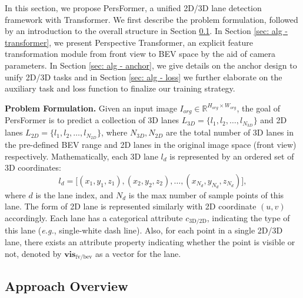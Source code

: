 \documentclass[runningheads]{llncs}
\begin{document}
In this section, we propose PersFormer, a unified 2D/3D lane detection framework with Transformer. 
We first describe the problem formulation, followed by an introduction to the overall structure in Section \ref{sec: alg - pipeline}. 
In Section \ref{sec: alg - transformer}, we present Perspective Transformer, an explicit feature transformation module
{from front view to BEV space by the aid of camera parameters}.
In Section \ref{sec: alg - anchor}, we give details on the anchor design to unify 2D/3D tasks
and in Section \ref{sec: alg - loss} we further elaborate on the auxiliary task and loss function to finalize our training strategy.


\textbf{Problem Formulation.}
Given an input image $I_{org} \in \mathbb{R}^{H_{org} \times W_{org}}$, the goal of PersFormer is to predict a collection of 3D lanes $L_{3D} = \{ l_1, l_2, \dots, l_{N_{3D}} \}$ and 2D lanes ${L_{2D} = \{ l_1, l_2, \dots, l_{N_{2D}} \}}$, 
where $N_{3D}, N_{2D}$ are the total number of 3D lanes in the pre-defined BEV range and 2D lanes in the original image space (front view) respectively.
Mathematically, each 3D lane $l_d$ is represented by an ordered set of 3D coordinates:
\begin{equation}
    l_d = \big[(x_{1}, y_{1}, z_{1}), (x_{2}, y_{2}, z_{2}), \dots, (x_{N_d}, y_{N_d}, z_{N_d}) \big],
    \label{eqn: 3d_lane_represent}
\end{equation}
where $d$ is the lane index, and $N_d$ is the max number of sample points of this lane. The form of 2D lane is represented similarly with 2D coordinate $(u,v)$ accordingly.
Each lane has a categorical attribute ${c_{\text{3D/2D}}}$, indicating the type of this lane (\textit{e.g.}, 
single-white dash line). 
Also, for each point in a single 2D/3D lane, there exists an attribute property indicating whether the point is visible or not, denoted by $\textbf{vis}_{\text{fv/bev}}$ as a vector for the lane.




\subsection{Approach Overview}\label{sec: alg - pipeline}
\end{document}
